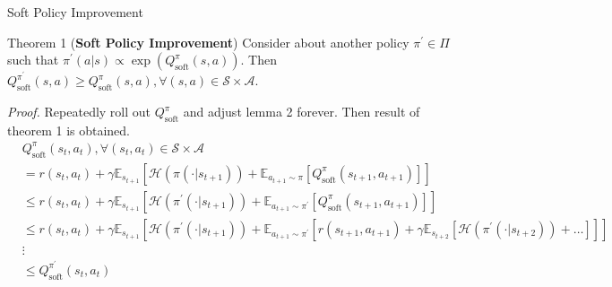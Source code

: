 \documentclass[8pt]{beamer}
\begin{document}
\begin{frame}{Soft Policy Improvement}
    \begin{block}{Theorem 1 (\textbf{Soft Policy Improvement})}
        Consider about another policy \(\pi^\prime \in \Pi\) such that \(\pi^\prime(a|s) \propto \exp{(Q^\pi_\text{soft}(s, a))} \). Then
        \(Q^{\pi^\prime}_\text{soft}(s,a) \geq Q^{\pi}_\text{soft}(s,a), \forall (s,a) \in \mathcal{S}\times\mathcal{A}\).
    \end{block}

    \textit{Proof.} Repeatedly roll out $Q^\pi_\text{soft}$ and adjust lemma 2 forever. Then result of theorem 1 is obtained.
    \[
    \begin{aligned}
        &Q^\pi_\text{soft}(s_t,a_t), \forall (s_t,a_t) \in \mathcal{S}\times \mathcal{A} \\
        &= r(s_t,a_t) + \gamma \mathbb{E}_{s_{t+1}} [\mathcal{H}(\pi(\cdot | s_{t+1})) + \mathbb{E}_{a_{t+1} \sim \pi}[Q^\pi_\text{soft}(s_{t+1}, a_{t+1})]] \\
        &\leq r(s_t, a_t) + \gamma \mathbb{E}_{s_{t+1}}[\mathcal{H}(\pi^\prime (\cdot | s_{t+1})) + \mathbb{E}_{a_{t+1}\sim \pi^\prime}[Q^\pi_\text{soft}(s_{t+1}, a_{t+1})]] \\
        &\leq r(s_t, a_t) + \gamma \mathbb{E}_{s_{t+1}}[\mathcal{H}(\pi^\prime( \cdot| s_{t+1})) + \mathbb{E}_{a_{t+1}\sim \pi^\prime} [r(s_{t+1}, a_{t+1}) + \gamma \mathbb{E}_{s_{t+2}}[\mathcal{H}(\pi^\prime(\cdot | s_{t+2})) + \dots]]]
        \\
        &\vdots \\
        &\leq Q^{\pi^\prime}_{\text{soft}}(s_t,a_t)
    \end{aligned}
    \]

\end{frame}
\end{document}

